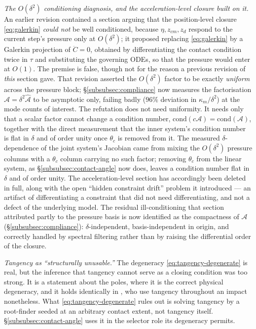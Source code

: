 \emph{The $O(\delta^2)$ conditioning diagnosis, and the acceleration-level closure built on it.} An earlier revision contained a section arguing that the position-level closure \eqref{eq:galerkin} \emph{could not} be well conditioned, because $\eta,z_{cm},z_d$ respond to the current step's pressure only at $O(\delta^2)$; it proposed replacing \eqref{eq:galerkin} by a Galerkin projection of $\ddot C=0$, obtained by differentiating the contact condition twice in $\tau$ and substituting the governing ODEs, so that the pressure would enter at $O(1)$. The premise is false, though not for the reason a previous revision of \emph{this} section gave. That revision asserted the $O(\delta^2)$ factor to be exactly \emph{uniform} across the pressure block; \S\ref{subsubsec:compliance} now measures the factorisation $\mathcal A=\delta^2\widehat{\mathcal A}$ to be asymptotic only, failing badly ($96\%$ deviation in $\kappa_m/\delta^2$) at the mode counts of interest. The refutation does not need uniformity. It needs only that a scalar factor cannot change a condition number, $\mathrm{cond}(c\mathcal A)=\mathrm{cond}(\mathcal A)$, together with the direct measurement that the inner system's condition number is flat in $\delta$ and of order unity once $\theta_c$ is removed from it. The measured $\delta$-dependence of the joint system's Jacobian came from mixing the $O(\delta^2)$ pressure columns with a $\theta_c$ column carrying no such factor; removing $\theta_c$ from the linear system, as \S\ref{subsubsec:contact-angle} now does, leaves a condition number flat in $\delta$ and of order unity. The acceleration-level section has accordingly been deleted in full, along with the open ``hidden constraint drift'' problem it introduced --- an artifact of differentiating a constraint that did not need differentiating, and not a defect of the underlying model. The residual ill-conditioning that section attributed partly to the pressure basis is now identified as the compactness of $\mathcal A$ (\S\ref{subsubsec:compliance}): $\delta$-independent, basis-independent in origin, and correctly handled by spectral filtering rather than by raising the differential order of the closure.

\emph{Tangency as ``structurally unusable.''} The degeneracy \eqref{eq:tangency-degenerate} is real, but the inference that tangency cannot serve as a closing condition was too strong. It is a statement about the poles, where it is the correct physical degeneracy, and it holds identically in \cite{AgueroEtAl2026}, who use tangency throughout an impact nonetheless. What \eqref{eq:tangency-degenerate} rules out is solving tangency by a root-finder seeded at an arbitrary contact extent, not tangency itself. \S\ref{subsubsec:contact-angle} uses it in the selector role its degeneracy permits.

